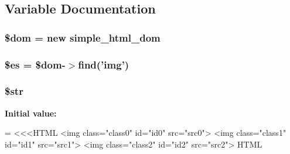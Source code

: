 \subsection{Variable Documentation}
\hypertarget{misc__testcase_8php_a46127a794280dd592812c25b62af34b0}{
\subsubsection[{\$dom}]{\setlength{\rightskip}{0pt plus 5cm}\$dom = new {\bf simple\+\_\+html\+\_\+dom}}}\label{misc__testcase_8php_a46127a794280dd592812c25b62af34b0}
\hypertarget{misc__testcase_8php_a388cbda27103d2baee3997798d1f2744}{
\subsubsection[{\$es}]{\setlength{\rightskip}{0pt plus 5cm}\$es = \$dom-\/$>$find('img')}}\label{misc__testcase_8php_a388cbda27103d2baee3997798d1f2744}
\hypertarget{misc__testcase_8php_a7542d95618011800c61773127fa625cf}{
\subsubsection[{\$str}]{\setlength{\rightskip}{0pt plus 5cm}\$str}}\label{misc__testcase_8php_a7542d95618011800c61773127fa625cf}
{\bfseries Initial value\+:}
\begin{DoxyCode}
= <<<HTML
<img \textcolor{keyword}{class}=\textcolor{stringliteral}{"class0"} \textcolor{keywordtype}{id}=\textcolor{stringliteral}{"id0"} src=\textcolor{stringliteral}{"src0"}>
<img \textcolor{keyword}{class}=\textcolor{stringliteral}{"class1"} \textcolor{keywordtype}{id}=\textcolor{stringliteral}{"id1"} src=\textcolor{stringliteral}{"src1"}>
<img \textcolor{keyword}{class}=\textcolor{stringliteral}{"class2"} \textcolor{keywordtype}{id}=\textcolor{stringliteral}{"id2"} src=\textcolor{stringliteral}{"src2"}>
HTML
\end{DoxyCode}
